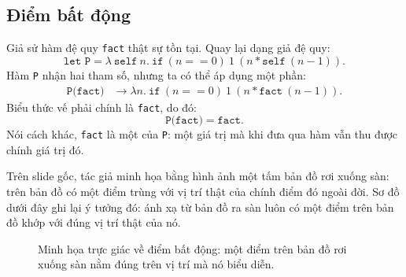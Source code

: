 \documentclass[11pt]{article}
\begin{document}
\subsection{Điểm bất động}

Giả sử hàm đệ quy \texttt{fact} thật sự tồn tại. Quay lại dạng giả đệ quy:
\[
  \texttt{let P} =
  \lambda\ \texttt{self}\ n.\
  \texttt{if}\ (n==0)\ 1\ (n * \texttt{self}\ (n-1)).
\]
Hàm \texttt{P} nhận hai tham số, nhưng ta có thể áp dụng một phần:
\[
\begin{aligned}
  \texttt{P(fact)}
  &\rightarrow
  \lambda n.\ \texttt{if}\ (n==0)\ 1\ (n * \texttt{fact}\ (n-1)).
\end{aligned}
\]
Biểu thức vế phải chính là \texttt{fact}, do đó:
\[
  \texttt{P(fact)} = \texttt{fact}.
\]
Nói cách khác, \texttt{fact} là một  của \texttt{P}: một
giá trị mà khi đưa qua hàm vẫn thu được chính giá trị đó.

Trên slide gốc, tác giả minh họa bằng hình ảnh một tấm bản đồ rơi xuống sàn:
trên bản đồ có một điểm trùng với vị trí thật của chính điểm đó ngoài đời.
Sơ đồ dưới đây ghi lại ý tưởng đó: ánh xạ từ bản đồ ra sàn luôn có một điểm
trên bản đồ khớp với đúng vị trí thật của nó.

\begin{figure}[h]
\centering
{}
\caption{Minh họa trực giác về điểm bất động: một điểm trên bản đồ rơi xuống
sàn nằm đúng trên vị trí mà nó biểu diễn.}
\end{figure}
\end{document}
